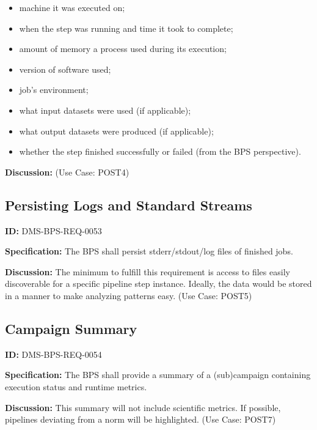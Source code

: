 \documentclass[SE,toc]{lsstdoc}
\begin{document}
    \begin{itemize}
\item
machine it was executed on;

\item
when the step was running and time it took to complete;

\item
amount of memory a process used during its execution;

\item
version of software used;

\item
job’s environment;

\item
what input datasets were used (if applicable);

\item
what output datasets were produced (if applicable);

\item
 whether the step finished successfully or failed (from the BPS perspective).

    \end{itemize}

\textbf{Discussion:}
(Use Case: POST4)

\subsection{Persisting Logs and Standard Streams}

\label{DMS-BPS-REQ-0053}
\textbf{ID:} DMS-BPS-REQ-0053

\textbf{Specification:}
The BPS shall persist stderr/stdout/log files of finished jobs.

\textbf{Discussion:}
The minimum to fulfill this requirement is access to files easily discoverable for a specific pipeline step instance.   Ideally, the data would be stored in a manner to make analyzing patterns easy. (Use Case: POST5)

\subsection{Campaign Summary}

\label{DMS-BPS-REQ-0054}
\textbf{ID:} DMS-BPS-REQ-0054

\textbf{Specification:}
The BPS shall provide a summary of a (sub)campaign containing execution status and runtime metrics.

\textbf{Discussion:}
This summary will not include scientific metrics.  If possible, pipelines deviating from a norm will be highlighted. (Use Case: POST7)
\end{document}
